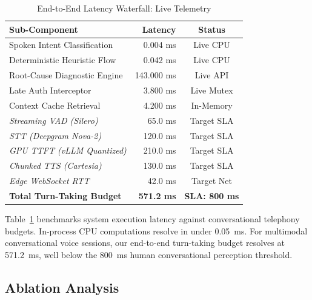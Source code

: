 \documentclass[10pt, twocolumn, a4paper]{article}
\begin{document}
\begin{table}[t]
\centering
\small
\caption{End-to-End Latency Waterfall: Live Telemetry}
\label{tab:latency}
\begin{tabularx}{\linewidth}{Xrc}
\toprule
\textbf{Sub-Component} & \textbf{Latency} & \textbf{Status} \\
\midrule
Spoken Intent Classification & 0.004 ms & Live CPU \\
Deterministic Heuristic Flow & 0.042 ms & Live CPU \\
Root-Cause Diagnostic Engine & 143.000 ms & Live API \\
Late Auth Interceptor & 3.800 ms & Live Mutex \\
Context Cache Retrieval & 4.200 ms & In-Memory \\
\midrule
\textit{Streaming VAD (Silero)} & 65.0 ms & Target SLA \\
\textit{STT (Deepgram Nova-2)} & 120.0 ms & Target SLA \\
\textit{GPU TTFT (vLLM Quantized)} & 210.0 ms & Target SLA \\
\textit{Chunked TTS (Cartesia)} & 130.0 ms & Target SLA \\
\textit{Edge WebSocket RTT} & 42.0 ms & Target Net \\
\midrule
\textbf{Total Turn-Taking Budget} & \textbf{571.2 ms} & \textbf{SLA: 800 ms} \\
\bottomrule
\end{tabularx}
\end{table}

Table~\ref{tab:latency} benchmarks system execution latency against conversational telephony budgets. In-process CPU computations resolve in under 0.05~ms. For multimodal conversational voice sessions, our end-to-end turn-taking budget resolves at 571.2~ms, well below the 800~ms human conversational perception threshold.

\subsection{Ablation Analysis}
\end{document}
